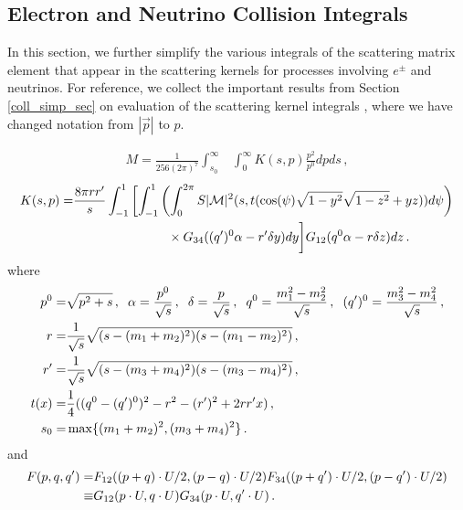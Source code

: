 \subsection{Electron and Neutrino Collision Integrals}\label{nu_matrix_elements}
In this section, we further simplify the various integrals of the scattering matrix element that appear in the scattering kernels for processes involving $e^\pm$ and neutrinos.  For reference, we collect the important results from Section \ref{coll_simp_sec} on evaluation of the scattering kernel integrals , where we have changed notation from $|\vec p|$ to $p$.

\begin{align}\label{M_simp}
M=\frac{1}{256(2\pi)^7 }\int_{s_0}^\infty&\int_0^\infty K(s,p)\frac{ p^2}{p^0}dpds\,,
\end{align}
\begin{align}\label{matrix_elem_int}
K(s,p)=&\frac{8\pi rr^{\prime}}{s}\int_{-1}^1 \left[\int_{-1}^1\left(\int_0^{2\pi} S |\mathcal{M}|^2 (s,t(\cos(\psi)\sqrt{1-y^2}\sqrt{1-z^2}+yz))d\psi\right)\right.\\
&\hspace{26mm}\times G_{34}((q^{\prime})^0\alpha-r^{\prime}\delta y) dy\bigg] G_{12}(q^0\alpha-r\delta z)dz\,.\notag
\end{align}
where
\begin{align}\label{t_def}
p^0=&\sqrt{p^2+s}\,,\hspace{2mm} \alpha=\frac{p^0}{\sqrt{s}}\,, \hspace{2mm} \delta=\frac{p}{\sqrt{s}}\,,\hspace{2mm}q^{0}=\frac{m_1^2-m_2^2}{\sqrt{s}}\,,\hspace{2mm}(q^{\prime})^{0}=\frac{m_3^2-m_4^2}{\sqrt{s}}\,,\\
r=&\frac{1}{\sqrt{s}}\sqrt{(s-(m_1+m_2)^2)(s-(m_1-m_2)^2)}\,,\notag\\
 r^{\prime}=&\frac{1}{\sqrt{s}}\sqrt{(s-(m_3+m_4)^2)(s-(m_3-m_4)^2)}\,,\notag\\
t(x)=&\frac{1}{4}((q^0-(q^{\prime})^0)^2-r^2-(r^{\prime})^2+2rr^{\prime}x)\,,\notag\\
s_0=&\max\{(m_1+m_2)^2,(m_3+m_4)^2\}\,.\notag
\end{align}
and
\begin{align}
 F(p,q,q^{\prime})=&F_{12}((p+q)\cdot U/2,(p-q)\cdot U/2)F_{34}((p+q^{\prime})\cdot U/2,(p-q^{\prime})\cdot U/2)\\
\equiv &G_{12}(p\cdot U,q\cdot U)G_{34}(p\cdot U,q^{\prime}\cdot U)\notag\,.
\end{align}

